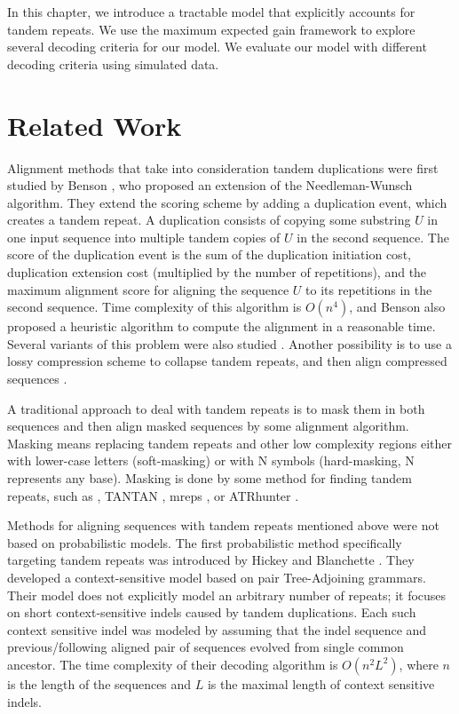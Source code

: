 In this chapter, we introduce a tractable model that explicitly accounts for
tandem repeats. We use the maximum expected gain framework to explore several
decoding criteria for our model. We evaluate our model with different decoding criteria using simulated data.

\section{Related Work}\label{SECTION:REPALNMETHODS}
 
Alignment methods that take into consideration tandem duplications were first
studied by Benson \cite{Benson1997}, who proposed an extension of the
Needleman-Wunsch algorithm. They extend the scoring scheme by adding a duplication
event, which creates a tandem repeat. A duplication consists of copying
some substring $U$ in one input sequence into multiple
tandem copies of $U$ in the second sequence. The score of the duplication
event is the sum of the duplication initiation cost, duplication extension
cost (multiplied by the number of repetitions), and the maximum alignment score
for aligning the sequence $U$ to its repetitions in the second sequence. Time
complexity of this algorithm is $O(n^4)$, and Benson also proposed a heuristic
algorithm to compute the alignment in a reasonable time.  Several variants of
this problem were also studied \cite{Sammeth2006, Berard2006}. Another
possibility is to use a lossy compression scheme to collapse tandem repeats,
and then align compressed sequences \cite{Freschi2012}.

A traditional approach to deal with tandem repeats is to mask them in both
sequences and then align masked sequences by some alignment algorithm.  Masking
means replacing tandem repeats and other low complexity regions either with
lower-case letters (soft-masking) or with N symbols (hard-masking, N represents
any base). Masking is done by some method for finding tandem repeats, such as
 \cite{Benson1999}, TANTAN
\cite{Frith2011}, mreps \cite{Kolpakov2003}, or ATRhunter \cite{Wexler2005}. 

Methods for aligning sequences with tandem repeats mentioned above were not based on probabilistic models. The first
probabilistic method specifically targeting tandem repeats was introduced by
Hickey and Blanchette \cite{Hickey2011}.  They developed a context-sensitive
model based on pair Tree-Adjoining grammars.  Their model does not explicitly
model an arbitrary number of repeats; it focuses on short context-sensitive
indels caused by tandem duplications. Each such context sensitive indel was
modeled by assuming that the indel sequence and previous/following aligned pair
of sequences evolved from single common ancestor. The time complexity of their
decoding algorithm is $O(n^2L^2)$, where $n$ is the length of the sequences and
$L$ is the maximal length of context sensitive indels.

